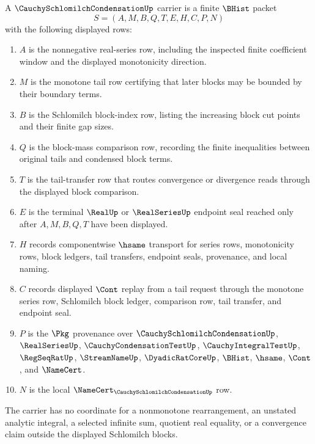 \begin{definition}
\label{def:cauchy-schlomilch-condensation-carrier}
A $\CauchySchlomilchCondensationUp$ carrier is a finite $\BHist$ packet
$$
S=(A,M,B,Q,T,E,H,C,P,N)
$$
with the following displayed rows:
\begin{enumerate}
\item $A$ is the nonnegative real-series row, including the inspected finite coefficient window and the displayed monotonicity direction.
\item $M$ is the monotone tail row certifying that later blocks may be bounded by their boundary terms.
\item $B$ is the Schlomilch block-index row, listing the increasing block cut points and their finite gap sizes.
\item $Q$ is the block-mass comparison row, recording the finite inequalities between original tails and condensed block terms.
\item $T$ is the tail-transfer row that routes convergence or divergence reads through the displayed block comparison.
\item $E$ is the terminal $\RealUp$ or $\RealSeriesUp$ endpoint seal reached only after $A,M,B,Q,T$ have been displayed.
\item $H$ records componentwise $\hsame$ transport for series rows, monotonicity rows, block ledgers, tail transfers, endpoint seals, provenance, and local naming.
\item $C$ records displayed $\Cont$ replay from a tail request through the monotone series row, Schlomilch block ledger, comparison row, tail transfer, and endpoint seal.
\item $P$ is the $\Pkg$ provenance over $\CauchySchlomilchCondensationUp$, $\RealSeriesUp$, $\CauchyCondensationTestUp$, $\CauchyIntegralTestUp$, $\RegSeqRatUp$, $\StreamNameUp$, $\DyadicRatCoreUp$, $\BHist$, $\hsame$, $\Cont$, and $\NameCert$.
\item $N$ is the local $\NameCert_{\CauchySchlomilchCondensationUp}$ row.
\end{enumerate}
The carrier has no coordinate for a nonmonotone rearrangement, an unstated analytic integral, a selected infinite sum, quotient real equality, or a convergence claim outside the displayed Schlomilch blocks.
\end{definition}

